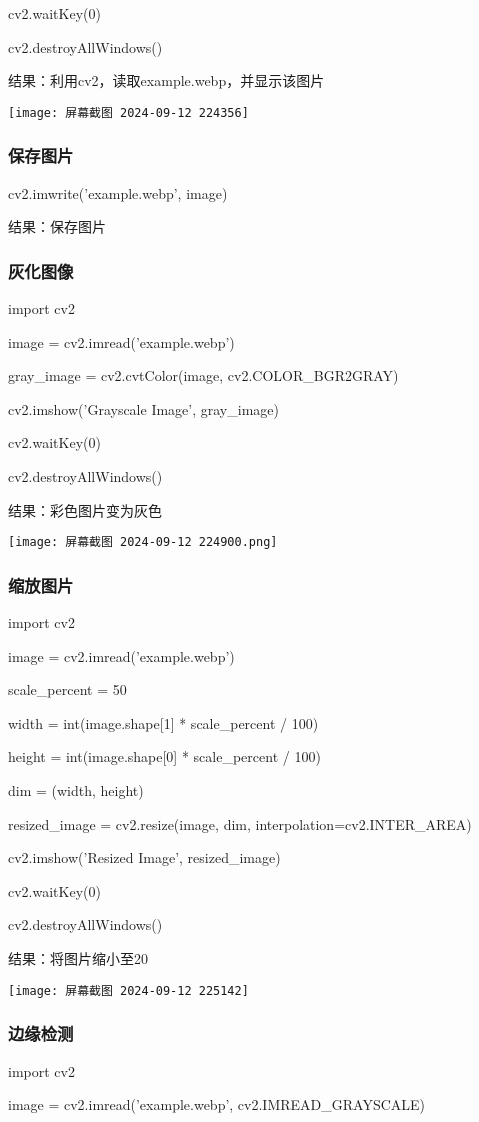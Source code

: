 \documentclass{ctexart}
\begin{document}
cv2.waitKey(0)

cv2.destroyAllWindows()

结果：利用cv2，读取example.webp，并显示该图片

\texttt{[image: 屏幕截图 2024-09-12 224356]}
\subsubsection{保存图片}
cv2.imwrite('example.webp', image)

结果：保存图片
\subsubsection{灰化图像}
import cv2

image = cv2.imread('example.webp')

gray_image = cv2.cvtColor(image, cv2.COLOR_BGR2GRAY)

cv2.imshow('Grayscale Image', gray_image)

cv2.waitKey(0)

cv2.destroyAllWindows()

结果：彩色图片变为灰色

\texttt{[image: 屏幕截图 2024-09-12 224900.png]}
\subsubsection{缩放图片}
import cv2

image = cv2.imread('example.webp')

scale_percent = 50 

width = int(image.shape[1] * scale_percent / 100)

height = int(image.shape[0] * scale_percent / 100)

dim = (width, height)

resized_image = cv2.resize(image, dim, interpolation=cv2.INTER_AREA)

cv2.imshow('Resized Image', resized_image)

cv2.waitKey(0)

cv2.destroyAllWindows()

结果：将图片缩小至20%

\texttt{[image: 屏幕截图 2024-09-12 225142]}
\subsubsection{边缘检测}
import cv2

image = cv2.imread('example.webp', cv2.IMREAD_GRAYSCALE)
\end{document}
